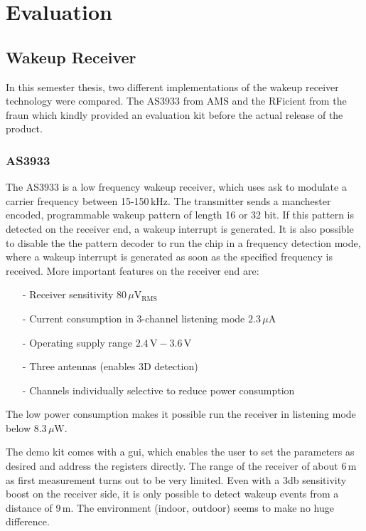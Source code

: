 \chapter{Evaluation}

\section{Wakeup Receiver}
In this semester thesis, two different implementations of the wakeup receiver technology were compared.
The AS3933 from AMS and the RFicient from the \acf{fraun} which kindly provided an evaluation kit before the actual release of the product.

\subsection{AS3933}
The AS3933 is a low frequency wakeup receiver, which uses \acs{ask} to modulate a carrier frequency between 15-150\,kHz.
The transmitter sends a manchester encoded, programmable wakeup pattern of length 16 or 32 bit.
If this pattern is detected on the receiver end, a wakeup interrupt is generated.
It is also possible to disable the the pattern decoder to run the chip in a frequency detection mode, where a wakeup interrupt is generated as soon as the specified frequency is received.
More important features on the receiver end are:
\begin{itemize}
	\item[-] Receiver sensitivity $80\,\mu\text{V$_{\text{RMS}}$}$
	\item[-] Current consumption in 3-channel listening mode $2.3\,\mu\text{A}$
	\item[-] Operating supply range $2.4\,\text{V}-3.6\,\text{V}$
	\item[-] Three antennas (enables 3D detection)
	\item[-] Channels  individually selective to reduce power consumption
\end{itemize}
The low power consumption makes it possible run the receiver in listening mode below $8.3\,\mu\text{W}$\cite{as3933}.

The demo kit comes with a \acs{gui}, which enables the user to set the parameters as desired and address the registers directly.
The range of the receiver of about 6\,m as first measurement turns out to be very limited.
Even with a 3db sensitivity boost on the receiver side, it is only possible to detect wakeup events from a distance of 9\,m.
The environment (indoor, outdoor) seems to make no huge difference.

